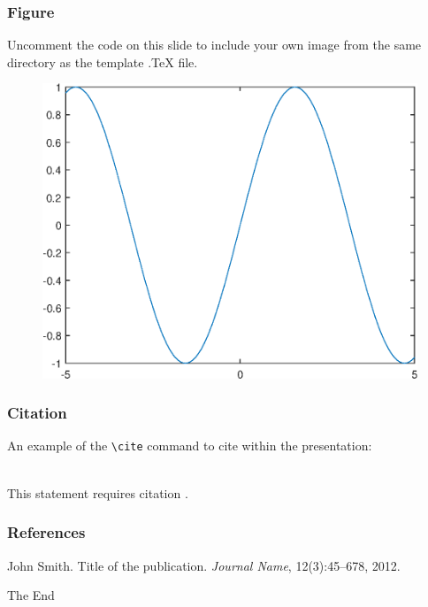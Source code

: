 \documentclass[notheorems,11pt,xcolor=table]{beamer}
\numberwithin{theorem}{section}
\numberwithin{definition}{section}
\numberwithin{lemma}{section}
\theoremstyle{example}
\numberwithin{figure}{section}
\numberwithin{table}{section}
\numberwithin{equation}{section}
\begin{document}
\begin{frame}
\frametitle{Figure}

Uncomment the code on this slide to include your own image from the same directory as the template .TeX file.
\begin{figure}[htp!]
\centering
\includegraphics[width=0.6\linewidth]{Image.eps}
\end{figure}
\end{frame}


\begin{frame}[fragile] %
\frametitle{Citation}
An example of the \verb|\cite| command to cite within the presentation:\\~

This statement requires citation \cite{Smith2012}.
\end{frame}


\begin{frame}
\frametitle{References}
\footnotesize{
\begin{thebibliography}{99} %
 John Smith. Title of the publication. \emph{Journal Name}, 12(3):45--678, 2012.
\end{thebibliography}
}
\end{frame}


\begin{frame}
\Huge{\centerline{The End}}
\end{frame}




%
\end{document}
